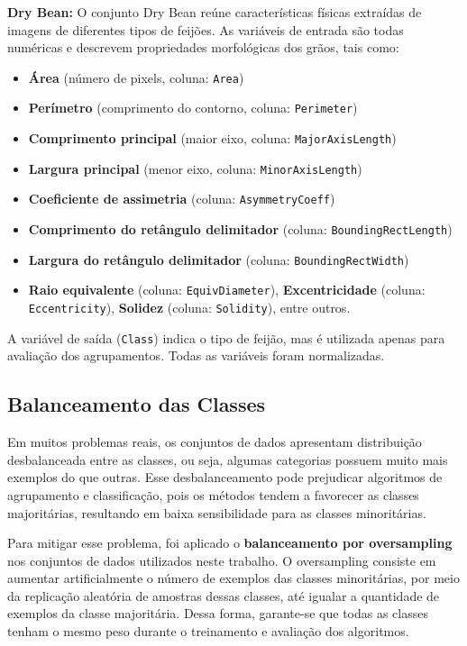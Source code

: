 \textbf{Dry Bean:} O conjunto Dry Bean reúne características físicas extraídas de imagens de diferentes tipos de feijões. As variáveis de entrada são todas numéricas e descrevem propriedades morfológicas dos grãos, tais como:
\begin{itemize}
    \item \textbf{Área} (número de pixels, coluna: \texttt{Area})
    \item \textbf{Perímetro} (comprimento do contorno, coluna: \texttt{Perimeter})
    \item \textbf{Comprimento principal} (maior eixo, coluna: \texttt{MajorAxisLength})
    \item \textbf{Largura principal} (menor eixo, coluna: \texttt{MinorAxisLength})
    \item \textbf{Coeficiente de assimetria} (coluna: \texttt{AsymmetryCoeff})
    \item \textbf{Comprimento do retângulo delimitador} (coluna: \texttt{BoundingRectLength})
    \item \textbf{Largura do retângulo delimitador} (coluna: \texttt{BoundingRectWidth})
    \item \textbf{Raio equivalente} (coluna: \texttt{EquivDiameter}), \textbf{Excentricidade} (coluna: \texttt{Eccentricity}), \textbf{Solidez} (coluna: \texttt{Solidity}), entre outros.
\end{itemize}
A variável de saída (\texttt{Class}) indica o tipo de feijão, mas é utilizada apenas para avaliação dos agrupamentos. Todas as variáveis foram normalizadas.

\subsection{Balanceamento das Classes}

Em muitos problemas reais, os conjuntos de dados apresentam distribuição desbalanceada entre as classes, ou seja, algumas categorias possuem muito mais exemplos do que outras. Esse desbalanceamento pode prejudicar algoritmos de agrupamento e classificação, pois os métodos tendem a favorecer as classes majoritárias, resultando em baixa sensibilidade para as classes minoritárias.

Para mitigar esse problema, foi aplicado o \textbf{balanceamento por oversampling} nos conjuntos de dados utilizados neste trabalho. O oversampling consiste em aumentar artificialmente o número de exemplos das classes minoritárias, por meio da replicação aleatória de amostras dessas classes, até igualar a quantidade de exemplos da classe majoritária. Dessa forma, garante-se que todas as classes tenham o mesmo peso durante o treinamento e avaliação dos algoritmos.

